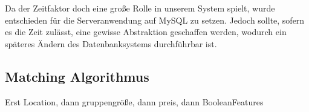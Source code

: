 Da der Zeitfaktor doch eine große Rolle in unserem System spielt, wurde entschieden für die Serveranwendung auf MySQL zu setzen. Jedoch sollte, sofern es die Zeit zulässt, eine gewisse Abstraktion geschaffen werden, wodurch ein späteres Ändern des Datenbanksystems durchführbar ist.

\subsection{Matching Algorithmus}

Erst Location, dann gruppengröße, dann preis, dann BooleanFeatures

